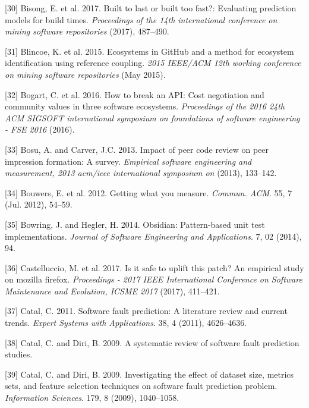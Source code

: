 \documentclass[]{book}
\begin{document}
\hypertarget{ref-bisong2017built}{}
{[}30{]} Bisong, E. et al. 2017. Built to last or built too fast?:
Evaluating prediction models for build times. \emph{Proceedings of the
14th international conference on mining software repositories} (2017),
487--490.

\hypertarget{ref-Blincoe2015}{}
{[}31{]} Blincoe, K. et al. 2015. Ecosystems in GitHub and a method for
ecosystem identification using reference coupling. \emph{2015 IEEE/ACM
12th working conference on mining software repositories} (May 2015).

\hypertarget{ref-Bogart2016}{}
{[}32{]} Bogart, C. et al. 2016. How to break an API: Cost negotiation
and community values in three software ecosystems. \emph{Proceedings of
the 2016 24th ACM SIGSOFT international symposium on foundations of
software engineering - FSE 2016} (2016).

\hypertarget{ref-bosu2013impact}{}
{[}33{]} Bosu, A. and Carver, J.C. 2013. Impact of peer code review on
peer impression formation: A survey. \emph{Empirical software
engineering and measurement, 2013 acm/ieee international symposium on}
(2013), 133--142.

\hypertarget{ref-bouwers2012a}{}
{[}34{]} Bouwers, E. et al. 2012. Getting what you measure.
\emph{Commun. ACM}. 55, 7 (Jul. 2012), 54--59.

\hypertarget{ref-bowring2014obsidian}{}
{[}35{]} Bowring, J. and Hegler, H. 2014. Obsidian: Pattern-based unit
test implementations. \emph{Journal of Software Engineering and
Applications}. 7, 02 (2014), 94.

\hypertarget{ref-castelluccio2017a}{}
{[}36{]} Castelluccio, M. et al. 2017. Is it safe to uplift this patch?
An empirical study on mozilla firefox. \emph{Proceedings - 2017 IEEE
International Conference on Software Maintenance and Evolution, ICSME
2017} (2017), 411--421.

\hypertarget{ref-Catal2011}{}
{[}37{]} Catal, C. 2011. Software fault prediction: A literature review
and current trends. \emph{Expert Systems with Applications}. 38, 4
(2011), 4626--4636.

\hypertarget{ref-Catal2009review}{}
{[}38{]} Catal, C. and Diri, B. 2009. A systematic review of software
fault prediction studies.

\hypertarget{ref-Catal2009investigating}{}
{[}39{]} Catal, C. and Diri, B. 2009. Investigating the effect of
dataset size, metrics sets, and feature selection techniques on software
fault prediction problem. \emph{Information Sciences}. 179, 8 (2009),
1040--1058.
\end{document}
